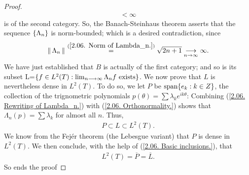 \begin{proof}
\begin{align}
{{      } < \infty
  } %
  \end{align}
%
is of the second category. %
So, the Banach-Steinhaus theorem  asserts that the sequence %
%
  $\{\Lambda_n\}$ %
%
is norm-bounded; which is a desired contradiction, since %
%
  \begin{align}
    \norm{}{\Lambda_n} \citeq{
      \ref{2.06. Norm of Lambda_n.}
    } \sqrt{2n + 1} \tendsto{n}{\infty}\infty.
%
  \end{align}
%
We have just established that $B$ is actually of the first category; %
and so is its subset %
%
  L=$\{f\in {L}^2(T): \lim_{n\longrightarrow\infty}\Lambda_n f \text{ exists}\}$. %
We now prove that $L$ is nevertheless dense in $L^2(T)$. %
To do so, we let $P$ be $\text{span}\{e_k: k\in Z\} $, %
the collection of the trignometric polynomials %
%
  $p(\theta)= \sum \lambda_k e^{ik\theta}$: %
%
Combining %
%
  (\ref{2.06. Rewriting of Lambda_n.}) with %
  (\ref{2.06. Orthonormality.}) %
%
shows that %
$\Lambda_n(p)= \sum \lambda_k$ for almost all $n$. %
Thus, 
%
  \begin{align}\label{2.06. Basic inclusions.}
    P \subset L \subset L^2(T).
  \end{align}
%
We know from the Fejér theorem (the Lebesgue variant) that %
$P$ is dense in $L^2(T)$. We then conclude, with the help of %
%
  (\ref{2.06. Basic inclusions.}), %
%
that %
%
  \begin{align}
    L^2(T) = \overline{P} = \overline{L}.
  \end{align}
%
So ends the proof
\end{proof}



